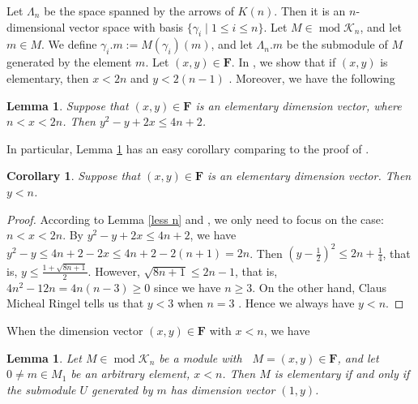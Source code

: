 \documentclass[a4paper,12pt]{amsart}
\newcommand{\cK}{\mathcal{K}}
\DeclareMathOperator{\modd}{mod}
\DeclareMathOperator{\dimu}{\underline{dim}}
\newtheorem{Lemma}[proposition]{Lemma}
\newtheorem{corollary}[proposition]{Corollary}
\begin{document}
Let $\Lambda_n$ be the  space spanned by the arrows of $K(n)$. Then  it is an $n$-dimensional vector space with basis $\{\gamma_i\mid 1\leq i\leq n\}$. Let $M\in\modd \cK_n$, and let $m\in M$.  We define $\gamma_i.m:=M(\gamma_i)(m)$,  and let $\Lambda_n.m$ be the  submodule  of $M$ generated by the element $m$. Let $(x,y)\in \mathbf{F}$.  In \cite{jie}, we show that if $(x,y)$ is elementary, then $x<2n$ and $y<2(n-1)$ \cite[Lemma 3.3, 3.4]{jie}. Moreover, we have the following

















\begin{Lemma}\label{2n} \cite[Lemma 3.8]{jie}
Suppose that  $(x,y)\in \mathbf{F}$ is an elementary dimension vector, where $n < x<2n$. Then 
 $y^2-y+2x\leq 4n+2$.

\end{Lemma}
In particular, Lemma \ref{2n} has an easy corollary comparing to the proof of \cite[Proposition 3.4]{Daniel2}. 


\begin{corollary}\label{y}
Suppose that  $(x,y)\in \mathbf{F}$ is an elementary dimension vector. Then $y< n$.

\end{corollary}
\begin{proof}
  According to Lemma \ref{less n} and  \cite[Lemma 3.6]{jie},  we only need to focus on the case: $n<x<2n$. 
By $y^2-y+2x\leq 4n+2$, we have $y^2-y \leq 4n+2-2x \leq 4n+2-2(n+1)=2n$. Then $(y-\frac{1}{2})^2\leq 2n+\frac{1}{4}$, that is, $y\leq \frac{1+\sqrt{8n+1}}{2}$. However,  $\sqrt{8n+1}\leq 2n-1$, that is, $4n^2-12n=4n(n-3) \geq 0$ since we have $n\geq 3$. On the other hand, Claus Micheal Ringel tells us that $y<3$ when $n=3$ \cite[Section 1. Theorem]{Claus2}. Hence we always have $y<n$.


\end{proof}

When the dimension vector $(x,y)\in \mathbf{F}$ with $x<n$, we have 

\begin{Lemma}\cite[Lemma 3.10]{jie}\label{n-1}
Let $M\in\modd \mathcal{K}_n$ be a module with $\dimu M=(x,y)\in \mathbf{F}$, and let $0\neq m\in M_1$ be an arbitrary element, $x<n$.   Then $M$ is elementary if and only if the submodule $U$ generated by $m$ has dimension vector $(1,y)$. 





\end{Lemma}
\end{document}
